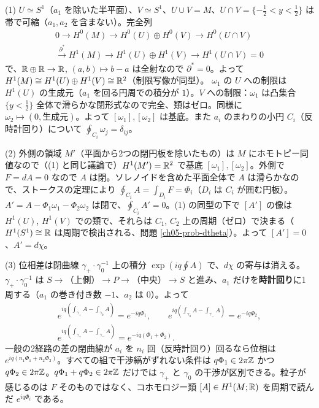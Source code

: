\begin{solution}
(1) $U\simeq S^1$（$a_1$ を除いた半平面）、$V\simeq S^1$、$U\cup V=M$、$U\cap V=\{-\tfrac12<y<\tfrac12\}$ は帯で可縮（$a_1,a_2$ を含まない）。完全列
\begin{multline*}
0\to H^0(M)\to H^0(U)\oplus H^0(V)\to H^0(U\cap V)\\
\xrightarrow{\partial^*}H^1(M)\to H^1(U)\oplus H^1(V)\to H^1(U\cap V)=0
\end{multline*}
で、$\mathbb{R}\oplus\mathbb{R}\to\mathbb{R}$, $(a,b)\mapsto b-a$ は全射なので $\partial^*=0$。よって $H^1(M)\cong H^1(U)\oplus H^1(V)\cong\mathbb{R}^2$（制限写像が同型）。
$\omega_1$ の $U$ への制限は $H^1(U)$ の生成元（$a_1$ を回る円周での積分が $1$）。$V$ への制限：$\omega_1$ は凸集合 $\{y<\frac12\}$ 全体で滑らかな閉形式なので完全、類はゼロ。同様に $\omega_2\mapsto(0,\text{生成元})$。よって $[\omega_1],[\omega_2]$ は基底。また $a_i$ のまわりの小円 $C_i$（反時計回り）について $\oint_{C_i}\omega_j=\delta_{ij}$。

(2) 外側の領域 $M'$（平面から2つの閉円板を除いたもの）は $M$ にホモトピー同値なので（(1) と同じ議論で）$H^1(M')=\mathbb{R}^2$ で基底 $[\omega_1],[\omega_2]$。外側で $F=dA=0$ なので $A$ は閉。ソレノイドを含めた平面全体で $A$ は滑らかなので、ストークスの定理により $\oint_{C_i}A=\int_{D_i}F=\Phi_i$（$D_i$ は $C_i$ が囲む円板）。$A'=A-\Phi_1\omega_1-\Phi_2\omega_2$ は閉で、$\oint_{C_i}A'=0$。(1) の同型の下で $[A']$ の像は $H^1(U)$, $H^1(V)$ での類で、それらは $C_1$, $C_2$ 上の周期（ゼロ）で決まる（$H^1(S^1)\cong\mathbb{R}$ は周期で検出される、問題 \ref{ch05-prob-dtheta}）。よって $[A']=0$、$A'=d\chi$。

(3) 位相差は閉曲線 $\gamma_+\cdot\gamma_0^{-1}$ 上の積分 $\exp(iq\oint A)$ で、$d\chi$ の寄与は消える。$\gamma_+\cdot\gamma_0^{-1}$ は $S\to$（上側）$\to P\to$（中央）$\to S$ と進み、$a_1$ だけを\textbf{時計回り}に1周する（$a_1$ の巻き付き数 $-1$、$a_2$ は $0$）。よって
\begin{gather*}
e^{iq(\int_{\gamma_+}A-\int_{\gamma_0}A)}=e^{-iq\Phi_1},\qquad
e^{iq(\int_{\gamma_0}A-\int_{\gamma_-}A)}=e^{-iq\Phi_2},\\
e^{iq(\int_{\gamma_+}A-\int_{\gamma_-}A)}=e^{-iq(\Phi_1+\Phi_2)} .
\end{gather*}
一般の2経路の差の閉曲線が $a_i$ を $n_i$ 回（反時計回り）回るなら位相は $e^{iq(n_1\Phi_1+n_2\Phi_2)}$。すべての組で干渉縞がずれない条件は $q\Phi_1\in2\pi\mathbb{Z}$ かつ $q\Phi_2\in2\pi\mathbb{Z}$。$q\Phi_1+q\Phi_2\in2\pi\mathbb{Z}$ だけでは $\gamma_+$ と $\gamma_0$ の干渉が区別できる。粒子が感じるのは $F$ そのものではなく、コホモロジー類 $[A]\in H^1(M;\mathbb{R})$ を周期で読んだ $e^{iq\Phi_i}$ である。
\end{solution}

